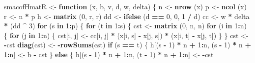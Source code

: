 \documentclass[12pt,]{article}
\newenvironment{Shaded}{\begin{snugshade}}{\end{snugshade}}
\newcommand{\KeywordTok}[1]{\textcolor[rgb]{0.13,0.29,0.53}{\textbf{#1}}}
\newcommand{\DecValTok}[1]{\textcolor[rgb]{0.00,0.00,0.81}{#1}}
\newcommand{\StringTok}[1]{\textcolor[rgb]{0.31,0.60,0.02}{#1}}
\newcommand{\ControlFlowTok}[1]{\textcolor[rgb]{0.13,0.29,0.53}{\textbf{#1}}}
\newcommand{\OperatorTok}[1]{\textcolor[rgb]{0.81,0.36,0.00}{\textbf{#1}}}
\newcommand{\NormalTok}[1]{#1}
\begin{document}
\begin{Shaded}
\begin{Highlighting}[]
{{\NormalTok{smacofHmatR <-}\StringTok{ }\ControlFlowTok{function}\NormalTok{ (x, b, v, d, w, delta) \{}
\NormalTok{  n <-}\StringTok{ }\KeywordTok{nrow}\NormalTok{ (x)}
\NormalTok{  p <-}\StringTok{ }\KeywordTok{ncol}\NormalTok{ (x)}
\NormalTok{  r <-}\StringTok{ }\NormalTok{n }\OperatorTok{*}\StringTok{ }\NormalTok{p}
\NormalTok{  h <-}\StringTok{ }\KeywordTok{matrix}\NormalTok{ (}\DecValTok{0}\NormalTok{, r, r)}
\NormalTok{  dd <-}\StringTok{ }\KeywordTok{ifelse}\NormalTok{ (d }\OperatorTok{==}\StringTok{ }\DecValTok{0}\NormalTok{, }\DecValTok{0}\NormalTok{, }\DecValTok{1} \OperatorTok{/}\StringTok{ }\NormalTok{d)}
\NormalTok{  cc <-}\StringTok{ }\NormalTok{w }\OperatorTok{*}\StringTok{ }\NormalTok{delta }\OperatorTok{*}\StringTok{ }\NormalTok{(dd }\OperatorTok{^}\StringTok{ }\DecValTok{3}\NormalTok{)}
  \ControlFlowTok{for}\NormalTok{ (s }\ControlFlowTok{in} \DecValTok{1}\OperatorTok{:}\NormalTok{p) \{}
    \ControlFlowTok{for}\NormalTok{ (t }\ControlFlowTok{in} \DecValTok{1}\OperatorTok{:}\NormalTok{s) \{}
\NormalTok{      cst <-}\StringTok{ }\KeywordTok{matrix}\NormalTok{ (}\DecValTok{0}\NormalTok{, n, n)}
      \ControlFlowTok{for}\NormalTok{ (i }\ControlFlowTok{in} \DecValTok{1}\OperatorTok{:}\NormalTok{n) \{}
        \ControlFlowTok{for}\NormalTok{ (j }\ControlFlowTok{in} \DecValTok{1}\OperatorTok{:}\NormalTok{n) \{}
\NormalTok{          cst[i, j] <-}\StringTok{ }\NormalTok{cc[i, j] }\OperatorTok{*}\StringTok{ }\NormalTok{(x[i, s] }\OperatorTok{-}\StringTok{ }\NormalTok{x[j, s]) }\OperatorTok{*}\StringTok{ }\NormalTok{(x[i, t] }\OperatorTok{-}\StringTok{ }\NormalTok{x[j, t])}
\NormalTok{        \}}
\NormalTok{      \}}
\NormalTok{      cst <-}\StringTok{ }\OperatorTok{-}\NormalTok{cst}
      \KeywordTok{diag}\NormalTok{(cst) <-}\StringTok{ }\OperatorTok{-}\KeywordTok{rowSums}\NormalTok{(cst)}
      \ControlFlowTok{if}\NormalTok{ (s }\OperatorTok{==}\StringTok{ }\NormalTok{t) \{}
\NormalTok{        h[(s }\OperatorTok{-}\StringTok{ }\DecValTok{1}\NormalTok{) }\OperatorTok{*}\StringTok{ }\NormalTok{n }\OperatorTok{+}\StringTok{ }\DecValTok{1}\OperatorTok{:}\NormalTok{n, (s }\OperatorTok{-}\StringTok{ }\DecValTok{1}\NormalTok{) }\OperatorTok{*}\StringTok{ }\NormalTok{n }\OperatorTok{+}\StringTok{ }\DecValTok{1}\OperatorTok{:}\NormalTok{n] <-}\StringTok{ }\NormalTok{b }\OperatorTok{-}\StringTok{ }\NormalTok{cst}
\NormalTok{      \} }\ControlFlowTok{else}\NormalTok{ \{}
\NormalTok{        h[(s }\OperatorTok{-}\StringTok{ }\DecValTok{1}\NormalTok{) }\OperatorTok{*}\StringTok{ }\NormalTok{n }\OperatorTok{+}\StringTok{ }\DecValTok{1}\OperatorTok{:}\NormalTok{n, (t }\OperatorTok{-}\StringTok{ }\DecValTok{1}\NormalTok{) }\OperatorTok{*}\StringTok{ }\NormalTok{n }\OperatorTok{+}\StringTok{ }\DecValTok{1}\OperatorTok{:}\NormalTok{n] <-}\StringTok{ }\OperatorTok{-}\NormalTok{cst}
}}
\end{Highlighting}
\end{Shaded}
\end{document}
